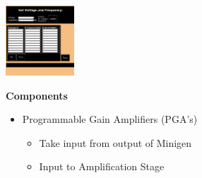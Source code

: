 \documentclass[25pt, a0paper, portrait, margin=0mm, innermargin=15mm, blockverticalspace=15mm, colspace=15mm, subcolspace=8mm]{tikzposter}
\begin{document}
\begin{columns}
{\begin{multicols}{2}


\end{multicols}
}

{
\begin{multicols}{2}
\begin{center}
\includegraphics[width=0.2\textwidth,keepaspectratio]{491_web_interface_good.png}
\end{center}

\textbf{Components}
\begin{itemize}
\item Programmable Gain Amplifiers (PGA's)
\begin{itemize}
\item Take input from output of Minigen
\item Input to Amplification Stage
\end{itemize}


\end{itemize}
\end{multicols}}
\end{columns}
\end{document}
